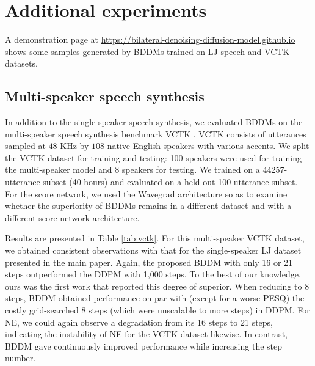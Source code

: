 \section{Additional experiments}
\label{appendix:C}
A demonstration page at \textcolor{blue}{\url{https://bilateral-denoising-diffusion-model.github.io}} shows some samples generated by BDDMs trained on LJ speech and VCTK datasets.

\subsection{Multi-speaker speech synthesis}
In addition to the single-speaker speech synthesis, we evaluated BDDMs on the multi-speaker speech synthesis benchmark VCTK \citep{yamagishi2019vctk}. VCTK consists of utterances sampled at $48$ KHz by $108$ native English speakers with various accents. 
We split the VCTK dataset for training and testing: 100 speakers were used for training the multi-speaker model and 8 speakers for testing.
We trained on a 44257-utterance subset (40 hours) and evaluated on a held-out 100-utterance subset. For the score network, we used the Wavegrad architecture \citep{nanxin2020} so as to examine whether the superiority of BDDMs remains in a different dataset and with a different score network architecture.


Results are presented in Table \ref{tab:vctk}. For this multi-speaker VCTK dataset, we obtained consistent observations with that for the single-speaker LJ dataset presented in the main paper.
Again, the proposed BDDM with only 16 or 21 steps outperformed the DDPM with 1,000 steps. To the best of our knowledge, ours was the first work that reported this degree of superior. When reducing to 8 steps, BDDM obtained performance on par with (except for a worse PESQ) the costly grid-searched 8 steps (which were unscalable to more steps) in DDPM. 
For NE, we could again observe a degradation from its 16 steps to 21 steps, indicating the instability of NE for the VCTK dataset likewise. In contrast, BDDM gave continuously improved performance while increasing the step number.


